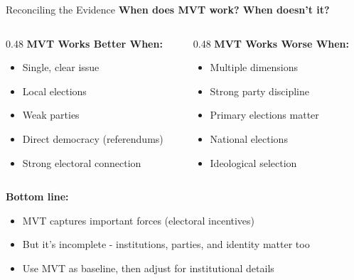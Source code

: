\documentclass[10pt]{beamer}
\begin{document}
\begin{frame}{Reconciling the Evidence}
\textbf{When does MVT work? When doesn't it?}

\vspace{0.2cm}
\begin{columns}
\begin{column}{0.48\textwidth}
\textbf{MVT Works Better When:}
\begin{itemize}
\item Single, clear issue
\item Local elections
\item Weak parties
\item Direct democracy (referendums)
\item Strong electoral connection
\end{itemize}
\end{column}


\begin{column}{0.48\textwidth}
\textbf{MVT Works Worse When:}
\begin{itemize}
\item Multiple dimensions
\item Strong party discipline
\item Primary elections matter
\item National elections
\item Ideological selection
\end{itemize}
\end{column}
\end{columns}



\textbf{Bottom line:}
\begin{itemize}
\item MVT captures important forces (electoral incentives)
\item But it's \alert{incomplete} - institutions, parties, and identity matter too
\item Use MVT as baseline, then adjust for institutional details
\end{itemize}
\end{frame}
\end{document}
